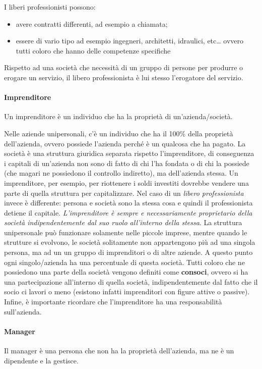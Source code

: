 I liberi professionisti possono:
\begin{itemize}
  \item avere contratti differenti, ad esempio a chiamata;
  \item essere di vario tipo ad esempio ingegneri, architetti, idraulici,
  etc\dots{} ovvero tutti coloro che hanno delle competenze specifiche
\end{itemize}
Rispetto ad una società che necessità di un gruppo di persone per produrre o
erogare un servizio, il libero professionista è lui stesso l'erogatore del
servizio.

\paragraph*{Imprenditore}
\begin{definition}[Imprenditore]
Un imprenditore è un individuo che ha la proprietà di un'azienda/società.
\end{definition}
\noindent Nelle aziende unipersonali, c'è un individuo che ha il 100\% della
proprietà dell'azienda, ovvero possiede l'azienda perché è un qualcosa che ha
pagato. La società è una struttura giuridica separata rispetto l'imprenditore,
di conseguenza i capitali di un'azienda non sono di fatto di chi l'ha fondata o
di chi la possiede (che magari ne possiedono il controllo indiretto), ma
dell'azienda stessa. Un imprenditore, per esempio, per riottenere i soldi
investiti dovrebbe vendere una parte di quella struttura per capitalizzare. Nel
caso di un \textit{libero professionista} invece è differente: persona e
società sono la stessa cosa e quindi il professionista detiene il capitale.
\textit{L'imprenditore è sempre e necessariamente proprietario della società
indipendentemente dal suo ruolo all'interno della stessa}.
La struttura unipersonale può funzionare solamente nelle piccole imprese,
mentre quando le strutture si evolvono, le società solitamente non appartengono
più ad una singola persona, ma ad un un gruppo di imprenditori o di altre
aziende. A questo punto ogni singolo/azienda ha una percentuale di questa
società. Tutti coloro che ne possiedono una parte della società vengono
definiti come \textbf{consoci}, ovvero si ha una partecipazione all'interno di
quella società, indipendentemente dal fatto che il socio ci lavori o meno
(esistono infatti imprenditori con figure attive o passive). Infine, è
importante ricordare che l'imprenditore ha una responsabilità sull'azienda.

\paragraph*{Manager}
\begin{definition}[Manager]
Il manager è una persona che non ha la proprietà dell'azienda, ma ne è un
dipendente e la gestisce.
\end{definition}

